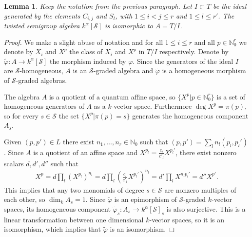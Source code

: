 \documentclass[11pt,fleqn]{article}
\theoremstyle{plain}
\newtheorem{Lemma}[Theorem]{Lemma}
\theoremstyle{remark}
\theoremstyle{definition}
\newcommand\NN{\mathbb N}
\renewcommand\to{\longrightarrow}
\renewcommand\phi{\varphi}
\renewcommand\S{\mathcal S}
\begin{document}
\begin{Lemma}
\label{semigroup-presentation}
Keep the notation from the previous paragraph. Let $I \subset T$ be the ideal generated by
the elements $C_{i,j}$ and $S_l$, with $1 \leq i < j \leq r$ and $1 \leq l \leq r'$. The
twisted semigroup algebra $k^\alpha[\S]$ is isomorphic to $A = T / I$.
\end{Lemma}
\begin{proof}
We make a slight abuse of notation and for all $1 \leq i \leq r$ and all $p \in \NN_0^r$
we denote by $X_i$ and $X^p$ the class of $X_i$ and $X^p$ in $T/I$ respectively. Denote by
$\tilde \phi: A \to k^\alpha[\S]$ the morphism induced by $\phi$. Since the generators of
the ideal $I$ are $\S$-homogeneous, $A$ is an $\S$-graded algebra and $\tilde \phi$ is a
homogeneous morphism of $\S$-graded algebras. 

The algebra $A$ is a quotient of a quantum affine space, so $\{X^p|p \in \NN_0^r\}$ is a
set of homogeneous generators of $A$ as a $k$-vector space. Furthermore $\deg X^p =
\pi(p)$, so for every $s \in \S$ the set $\{X^p|\pi(p) = s\}$ generates the homogeneous 
component $A_s$.

Given $(p,p') \in L$ there exist $n_1, \ldots, n_r \in \NN_0$ such that $(p,p')
= \sum_l n_l (p_l,p_l')$. Since $A$ is a quotient of an affine space and $X^{p_l} =
\frac{c_l}{c'_l} X^{p_l'}$, there exist nonzero scalars $d, d', d''$ such that
\begin{align*}
X^p = d \prod_l (X^{p_l})^{n_l} = d \prod_l \left(\frac{c_l}{c'_l} X^{p_l'}\right)^{n_l}
= d'\prod_l X^{n_l p_l'} = d'' X^{p'}.
\end{align*}
This implies that any two monomials of degree $s \in \S$ are nonzero multiples of each
other, so $\dim_k A_s = 1$. Since $\tilde \phi$ is an epimorphism of $\S$-graded
$k$-vector spaces, its homogeneous component $\tilde \phi_s: A_s \to k^\alpha[\S]_s$ is
also surjective. This is a linear transformation between one dimensional $k$-vector
spaces, so it is an isomorphism, which implies that $\tilde \phi$ is an isomorphism.
\end{proof}
\end{document}
